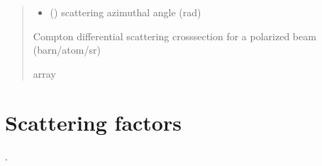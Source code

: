 \documentclass[letterpaper,10pt,english,openany,oneside]{sphinxmanual}
\begin{document}
\begin{fulllineitems}
\begin{quote}
\begin{description}
\begin{itemize}
\item {} 
\sphinxAtStartPar
{} () \textendash{} scattering azimuthal angle (rad)

\end{itemize}

\sphinxAtStartPar
Compton differential scattering cross\sphinxhyphen{}section for a polarized beam
(barn/atom/sr)

\sphinxAtStartPar
array

\end{description}\end{quote}

\end{fulllineitems}


\sphinxstepscope


\section{Scattering factors}
\label{\detokenize{api/scattering_factors:scattering-factors}}\label{\detokenize{api/scattering_factors::doc}}
\sphinxAtStartPar
{}.
\end{document}
